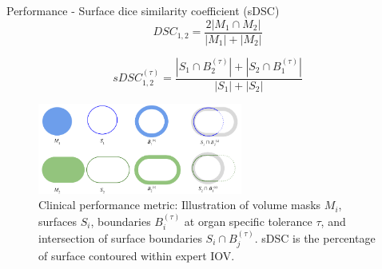 \documentclass[9pt]{beamer}
\begin{document}
\begin{frame}{Performance - Surface dice similarity coefficient (sDSC)}
  \begin{equation*}
    DSC_{1,2} = \frac{2|M_{1} \cap M_{2}|}{|M_{1}| + |M_{2}|}
    \label{eq:sDSC}
  \end{equation*}

  \vspace{4mm}

  \begin{equation*}
    sDSC_{1,2}^{(\tau)} = \frac{|S_{1} \cap B_{2}^{(\tau)}| + |S_{2} \cap B_{1}^{(\tau)}|}{|S_{1}| + |S_{2}|}
    \label{eq:sDSC}
  \end{equation*}

  \vspace{4mm}
  \begin{figure}
    \includegraphics[width=0.6\textwidth]{images/sDSC}
    \caption{Clinical performance metric: Illustration of volume masks $M_{i}$,
      surfaces $S_{i}$, boundaries $B_{i}^{(\tau)}$ at organ specific tolerance
      $\tau$, and intersection of surface boundaries $S_{i} \cap
      B_{j}^{(\tau)}$. sDSC is the percentage of surface contoured within expert IOV.\footnotemark[3]}
  \end{figure}
\end{frame}

%
\end{document}
